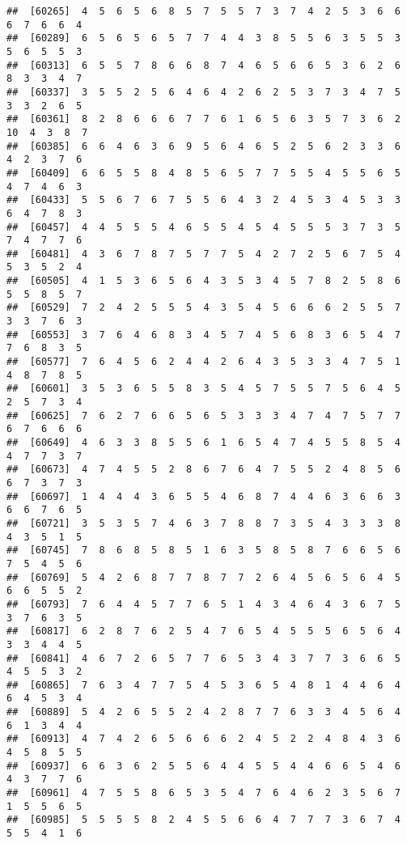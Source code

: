 \documentclass[
]{book}
\begin{document}
\begin{verbatim}
##  [60265]  4  5  6  5  6  8  5  7  5  5  7  3  7  4  2  5  3  6  6  6  7  6  6  4
##  [60289]  6  5  6  5  6  5  7  7  4  4  3  8  5  5  6  3  5  5  3  5  6  5  5  3
##  [60313]  6  5  5  7  8  6  6  8  7  4  6  5  6  6  5  3  6  2  6  8  3  3  4  7
##  [60337]  3  5  5  2  5  6  4  6  4  2  6  2  5  3  7  3  4  7  5  3  3  2  6  5
##  [60361]  8  2  8  6  6  6  7  7  6  1  6  5  6  3  5  7  3  6  2 10  4  3  8  7
##  [60385]  6  6  4  6  3  6  9  5  6  4  6  5  2  5  6  2  3  3  6  4  2  3  7  6
##  [60409]  6  6  5  5  8  4  8  5  6  5  7  7  5  5  4  5  5  6  5  4  7  4  6  3
##  [60433]  5  5  6  7  6  7  5  5  6  4  3  2  4  5  3  4  5  3  3  6  4  7  8  3
##  [60457]  4  4  5  5  5  4  6  5  5  4  5  4  5  5  5  3  7  3  5  7  4  7  7  6
##  [60481]  4  3  6  7  8  7  5  7  7  5  4  2  7  2  5  6  7  5  4  5  3  5  2  4
##  [60505]  4  1  5  3  6  5  6  4  3  5  3  4  5  7  8  2  5  8  6  5  5  8  5  7
##  [60529]  7  2  4  2  5  5  5  4  3  5  4  5  6  6  6  2  5  5  7  3  3  7  6  3
##  [60553]  3  7  6  4  6  8  3  4  5  7  4  5  6  8  3  6  5  4  7  7  6  8  3  5
##  [60577]  7  6  4  5  6  2  4  4  2  6  4  3  5  3  3  4  7  5  1  4  8  7  8  5
##  [60601]  3  5  3  6  5  5  8  3  5  4  5  7  5  5  7  5  6  4  5  2  5  7  3  4
##  [60625]  7  6  2  7  6  6  5  6  5  3  3  3  4  7  4  7  5  7  7  6  7  6  6  6
##  [60649]  4  6  3  3  8  5  5  6  1  6  5  4  7  4  5  5  8  5  4  4  7  7  3  7
##  [60673]  4  7  4  5  5  2  8  6  7  6  4  7  5  5  2  4  8  5  6  6  7  3  7  3
##  [60697]  1  4  4  4  3  6  5  5  4  6  8  7  4  4  6  3  6  6  3  6  6  7  6  5
##  [60721]  3  5  3  5  7  4  6  3  7  8  8  7  3  5  4  3  3  3  8  4  3  5  1  5
##  [60745]  7  8  6  8  5  8  5  1  6  3  5  8  5  8  7  6  6  5  6  7  5  4  5  6
##  [60769]  5  4  2  6  8  7  7  8  7  7  2  6  4  5  6  5  6  4  5  6  6  5  5  2
##  [60793]  7  6  4  4  5  7  7  6  5  1  4  3  4  6  4  3  6  7  5  3  7  6  3  5
##  [60817]  6  2  8  7  6  2  5  4  7  6  5  4  5  5  5  6  5  6  4  3  3  4  4  5
##  [60841]  4  6  7  2  6  5  7  7  6  5  3  4  3  7  7  3  6  6  5  4  5  5  3  2
##  [60865]  7  6  3  4  7  7  5  4  5  3  6  5  4  8  1  4  4  6  4  6  4  5  3  4
##  [60889]  5  4  2  6  5  5  2  4  2  8  7  7  6  3  3  4  5  6  4  6  1  3  4  4
##  [60913]  4  7  4  2  6  5  6  6  6  2  4  5  2  2  4  8  4  3  6  4  5  8  5  5
##  [60937]  6  6  3  6  2  5  5  6  4  4  5  5  4  4  6  6  5  4  6  4  3  7  7  6
##  [60961]  4  7  5  5  8  6  5  3  5  4  7  6  4  6  2  3  5  6  7  1  5  5  6  5
##  [60985]  5  5  5  5  8  2  4  5  5  6  6  4  7  7  7  3  6  7  4  5  5  4  1  6

\end{verbatim}
\end{document}
